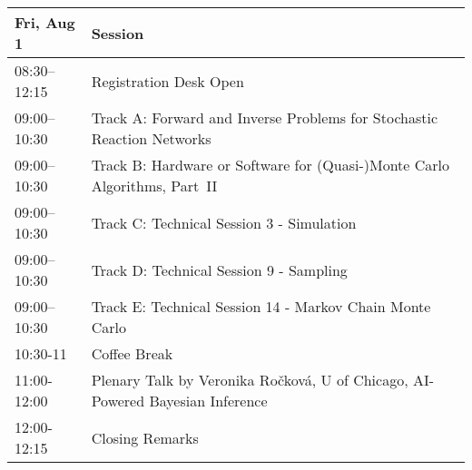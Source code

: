 \begin{table}
{\footnotesize
\begin{tabularx}{\textwidth}{>{\hsize=0.32\hsize}X|>{\hsize=1.7\hsize}X}
\hline
\textbf{Fri, Aug 1} & \textbf{Session} \\
\hline
\cellcolor{\EmptyColor}08:30–12:15 & \cellcolor{\EmptyColor}Registration Desk Open \\
\cellcolor{\SessionTitleColor}09:00–10:30 & \cellcolor{\SessionTitleColor}Track A: Forward and Inverse Problems for Stochastic Reaction Networks \\
\cellcolor{\SessionTitleColor}09:00–10:30 & \cellcolor{\SessionTitleColor}Track B: Hardware or Software for (Quasi-)Monte Carlo Algorithms, Part~II \\
\cellcolor{\SessionLightColor}09:00–10:30 & \cellcolor{\SessionLightColor}Track C: Technical Session 3 - Simulation \\
\cellcolor{\SessionLightColor}09:00–10:30 & \cellcolor{\SessionLightColor}Track D: Technical Session 9 - Sampling \\
\cellcolor{\SessionLightColor}09:00–10:30 & \cellcolor{\SessionLightColor}Track E: Technical Session 14 - Markov Chain Monte Carlo \\
\cellcolor{\EmptyColor}10:30-11 & \cellcolor{\EmptyColor}Coffee Break \\
\cellcolor{\PlenaryColor}11:00-12:00 & \cellcolor{\PlenaryColor}Plenary Talk by Veronika Ročková, U of Chicago, AI-Powered Bayesian Inference \\
\cellcolor{\PlenaryColor}12:00-12:15 & \cellcolor{\PlenaryColor}Closing Remarks \\
\hline
\end{tabularx}
}
\end{table}

